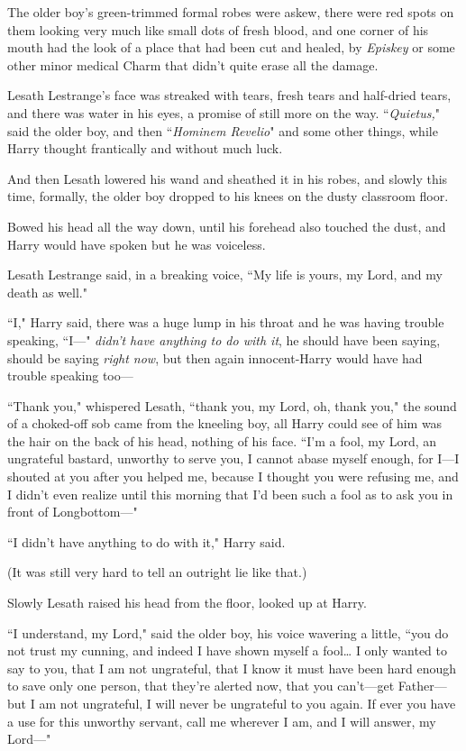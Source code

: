 The older boy's green-trimmed formal robes were askew, there were red spots on them looking very much like small dots of fresh blood, and one corner of his mouth had the look of a place that had been cut and healed, by \emph{Episkey} or some other minor medical Charm that didn't quite erase all the damage.

Lesath Lestrange's face was streaked with tears, fresh tears and half-dried tears, and there was water in his eyes, a promise of still more on the way. ``\emph{Quietus,}" said the older boy, and then ``\emph{Hominem Revelio}" and some other things, while Harry thought frantically and without much luck.

And then Lesath lowered his wand and sheathed it in his robes, and slowly this time, formally, the older boy dropped to his knees on the dusty classroom floor.

Bowed his head all the way down, until his forehead also touched the dust, and Harry would have spoken but he was voiceless.

Lesath Lestrange said, in a breaking voice, ``My life is yours, my Lord, and my death as well."

``I," Harry said, there was a huge lump in his throat and he was having trouble speaking, ``I---" \emph{didn't have anything to do with it}, he should have been saying, should be saying \emph{right now}, but then again innocent-Harry would have had trouble speaking too---

``Thank you," whispered Lesath, ``thank you, my Lord, oh, thank you," the sound of a choked-off sob came from the kneeling boy, all Harry could see of him was the hair on the back of his head, nothing of his face. ``I'm a fool, my Lord, an ungrateful bastard, unworthy to serve you, I cannot abase myself enough, for I---I shouted at you after you helped me, because I thought you were refusing me, and I didn't even realize until this morning that I'd been such a fool as to ask you in front of Longbottom---"

``I didn't have anything to do with it," Harry said.

(It was still very hard to tell an outright lie like that.)

Slowly Lesath raised his head from the floor, looked up at Harry.

``I understand, my Lord," said the older boy, his voice wavering a little, ``you do not trust my cunning, and indeed I have shown myself a fool{\ldots} I only wanted to say to you, that I am not ungrateful, that I know it must have been hard enough to save only one person, that they're alerted now, that you can't---get Father---but I am not ungrateful, I will never be ungrateful to you again. If ever you have a use for this unworthy servant, call me wherever I am, and I will answer, my Lord---"

